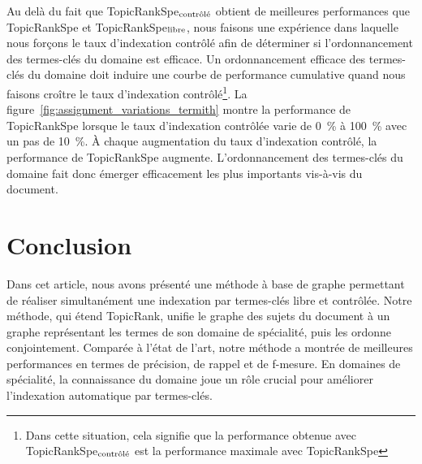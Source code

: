   Au delà du fait que TopicRankSpe$_\textnormal{contrôlé}$ obtient de
  meilleures performances que TopicRankSpe et
  TopicRankSpe$_\textnormal{libre}$, nous faisons une expérience dans
  laquelle nous forçons le taux d'indexation contrôlé afin de déterminer si
  l'ordonnancement des termes-clés du domaine est efficace.
  Un ordonnancement efficace des termes-clés du domaine doit induire une
  courbe de performance cumulative quand nous faisons croître le taux
  d'indexation contrôlé\footnote{Dans cette situation, cela signifie que la
  performance obtenue avec TopicRankSpe$_\textnormal{contrôlé}$ est la
  performance maximale avec TopicRankSpe}. La
  figure~\ref{fig:assignment_variations_termith} montre la performance de
  TopicRankSpe lorsque le taux d'indexation contrôlée varie de 0~\% à 100~\% avec un
  pas de 10~\%. À chaque augmentation du taux d'indexation contrôlé, la
  performance de TopicRankSpe augmente. L'ordonnancement des termes-clés du
  domaine fait donc émerger efficacement les plus
  importants vis-à-vis du document.
  


\section{Conclusion}
\label{sec:main-domain_specific_keyphrase_annotation-conclusion}
  Dans cet article, nous avons présenté une méthode à base de graphe permettant
  de réaliser simultanément une indexation par termes-clés libre et contrôlée.
  Notre méthode, qui étend TopicRank, unifie le graphe des sujets du document à
  un graphe représentant les termes de son domaine de spécialité, puis les
  ordonne conjointement. Comparée à l'état de l'art, notre méthode a montrée de
  meilleures performances en termes de précision, de rappel et de f-mesure. En
  domaines de spécialité, la connaissance du domaine joue un rôle crucial pour
  améliorer l'indexation automatique par termes-clés.

